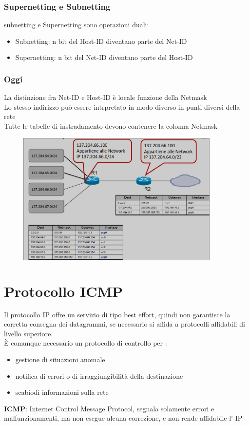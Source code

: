 \documentclass{report}
\begin{document}
            \subsection{Supernetting e Subnetting}
                subnetting e Supernetting sono operazioni duali:
                \begin{itemize}
                    \item Subnetting: n bit del Host-ID diventano parte del Net-ID
                    \item Supernetting: n bit del Net-ID diventano parte del Host-ID
                \end{itemize}
            \subsection{Oggi}
                La distinzione fra Net-ID e Host-ID è locale funzione della Netmask
                \\
                Lo stesso indirizzo può essere intrpretato in modo diverso in punti diversi della rete
                \\
                Tutte le tabelle di instradamento devono contenere la colonna Netmask
                 \begin{figure}[H]
                    \includegraphics[width=0.9\textwidth]{1/Oggi.png}
                \end{figure}
    \chapter{Protocollo ICMP}
        Il protocollo IP offre un servizio di tipo best effort, quindi non garantisce la corretta consegna dei datagrammi, se necessario si affida a protocolli affidabili di livello superiore.
        \\
        È comunque necessario un protocollo di controllo per :
        \begin{itemize}
            \item gestione di situazioni anomale
            \item notifica di errori o di irraggiungibilità della destinazione 
            \item scabiodi informazioni sulla rete
        \end{itemize}
        \textbf{ICMP}: Internet Control Message Protocol, segnala solamente errori e malfunzionamenti, ma non esegue alcuna correzione, e non rende affidabile l' IP
\end{document}
